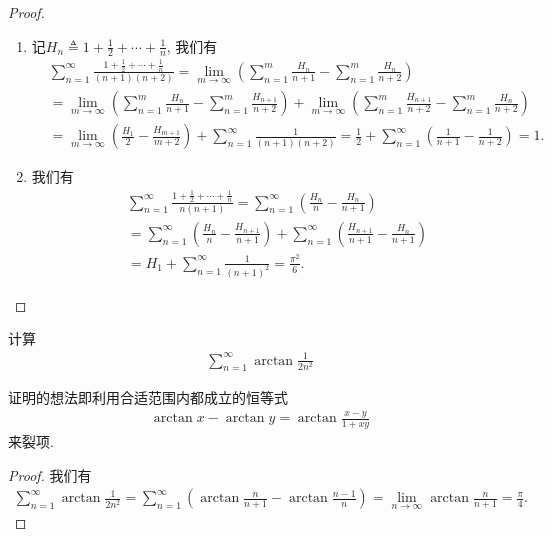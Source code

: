 \documentclass[../../main.tex]{subfiles}
\begin{document}
\begin{proof}
\begin{enumerate}
\item 记$H_n \triangleq 1 + \frac{1}{2} + \cdots + \frac{1}{n}$, 我们有
\begin{align*}
&\sum_{n=1}^{\infty} \frac{1 + \frac{1}{2} + \cdots + \frac{1}{n}}{(n + 1)(n + 2)} = \lim_{m \to \infty} \left( \sum_{n=1}^{m} \frac{H_n}{n + 1} - \sum_{n=1}^{m} \frac{H_n}{n + 2} \right) \\
&= \lim_{m \to \infty} \left( \sum_{n=1}^{m} \frac{H_n}{n + 1} - \sum_{n=1}^{m} \frac{H_{n + 1}}{n + 2} \right) + \lim_{m \to \infty} \left( \sum_{n=1}^{m} \frac{H_{n + 1}}{n + 2} - \sum_{n=1}^{m} \frac{H_n}{n + 2} \right) \\
&= \lim_{m \to \infty} \left( \frac{H_1}{2} - \frac{H_{m + 1}}{m + 2} \right) + \sum_{n=1}^{\infty} \frac{1}{(n + 1)(n + 2)} = \frac{1}{2} + \sum_{n=1}^{\infty} \left( \frac{1}{n + 1} - \frac{1}{n + 2} \right) = 1.
\end{align*}

\item 我们有
\begin{align*}
&\sum_{n=1}^{\infty} \frac{1 + \frac{1}{2} + \cdots + \frac{1}{n}}{n(n + 1)} = \sum_{n=1}^{\infty} \left( \frac{H_n}{n} - \frac{H_n}{n + 1} \right) \\
&= \sum_{n=1}^{\infty} \left( \frac{H_n}{n} - \frac{H_{n + 1}}{n + 1} \right) + \sum_{n=1}^{\infty} \left( \frac{H_{n + 1}}{n + 1} - \frac{H_n}{n + 1} \right) \\
&= H_1 + \sum_{n=1}^{\infty} \frac{1}{(n + 1)^2} = \frac{\pi^2}{6}.
\end{align*}
\end{enumerate}

\end{proof}

\begin{example}
计算
\begin{align*}
\sum_{n=1}^{\infty} \arctan \frac{1}{2n^2}
\end{align*}
\end{example}
\begin{note}
证明的想法即利用合适范围内都成立的恒等式
\begin{align*}
\arctan x - \arctan y = \arctan \frac{x - y}{1 + xy}
\end{align*}
来裂项.
\end{note}
\begin{proof}
我们有
\begin{align*}
\sum_{n=1}^{\infty} \arctan \frac{1}{2n^2} = \sum_{n=1}^{\infty} \left( \arctan \frac{n}{n + 1} - \arctan \frac{n - 1}{n} \right) = \lim_{n \to \infty} \arctan \frac{n}{n + 1} = \frac{\pi}{4}.
\end{align*}

\end{proof}
\end{document}
